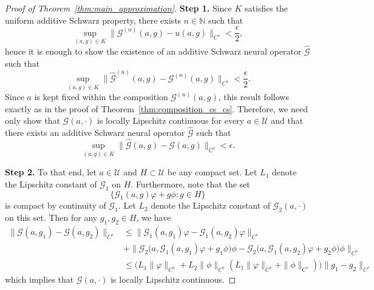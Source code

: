 \documentclass[preprint,11pt]{elsarticle}
\theoremstyle{plain}
\newcommand{\N}{\mathbb{N}}
\newcommand{\G}{\mathcal{G}}
\newcommand{\U}{\mathcal{U}}
\begin{document}
\begin{proof}[Proof of Theorem~\ref{thm:main_approximation}]
    \textbf{Step 1.} Since $K$ satisfies the uniform additive Schwarz property, there exists $n \in \N$ such that
    \[\sup_{(a,g) \in K} \|\G^{(n)}(a,g) - u(a,g)\|_{C^s} < \frac{\epsilon}{2},\]
    hence it is enough to show the existence of an additive Schwarz neural operator $\hat{\G}$ such that
    \[\sup_{(a,g) \in K} \|\hat{\G}^{(n)}(a,g) - \G^{(n)}(a,g)\|_{C^s} < \frac{\epsilon}{2}.\]
    Since $a$ is kept fixed within the composition $\G^{(n)}(a,g)$, this result follows exactly as in the proof of Theorem~\ref{thm:composition_cs_cs}. Therefore, we need only show that $\G(a,\cdot)$ is locally Lipschitz continuous for every $a \in \U$ and that there exists an additive Schwarz neural operator $\hat{\G}$ such that
    \[\sup_{(a,g) \in K} \|\hat{\G}(a,g) - \G(a,g)\|_{C^s} < \epsilon.\]
    
    \textbf{Step 2.} To that end, let $a \in \U$ and $H \subset \U$ be any compact set. Let $L_1$ denote the Lipschitz constant of $\G_1$ on $H$. Furthermore, note that the set
    \[\{\G_1(a,g) \varphi + g \phi : g \in H\}\]
    is compact by continuity of $\G_1$. Let $L_2$ denote the Lipschitz constant of $\G_2(a,\cdot)$ on this set. Then for any $g_1,g_2 \in H$, we have
    \begin{align*}
        \|\G(a,g_1) - \G(a,g_2)\|_{C^s} &\leq \|\G_1(a,g_1) \varphi - \G_1 (a,g_2) \varphi \|_{C^s} \\
        &+ \|\G_2 \big( a,\G_1(a,g_1) \varphi + g_1 \phi \big ) \phi - \G_2 \big( a,\G_1(a,g_2) \varphi + g_2 \phi \big ) \phi \|_{C^s} \\
        &\leq \big ( L_1 \|\varphi\|_{C^s}  + L_2 \|\phi\|_{C^s} (L_1 \|\varphi\|_{C^s} + \|\phi\|_{C^s}) \big ) \|g_1 - g_2\|_{C^s} 
    \end{align*}
    which implies that $\G(a,\cdot)$ is locally Lipschitz continuous.
    

\end{proof}
\end{document}

